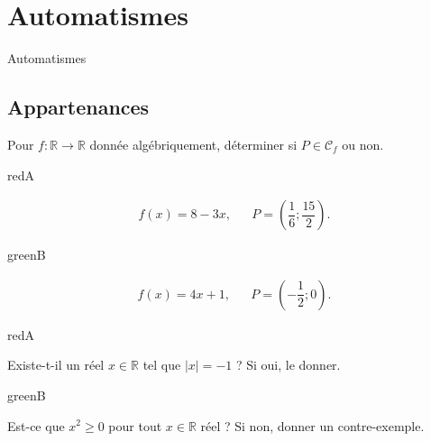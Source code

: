 \documentclass[14pt]{beamer}
\newcommand{\C}{\mathcal{C}}
\newcommand{\R}{\mathbb{R}}
\begin{document}
\section{Automatismes}

\begin{frame}

\centering \huge
Automatismes

\end{frame}

\subsection{Appartenances}


\begin{frame}{1}
	Pour $f:\R\rightarrow\R$ donnée algébriquement, déterminer si $P \in \C_f$ ou non.
	
		\begin{mybox}{red}{A}
		\begin{center}
			\begin{align*} f(x) = 8-3x, && P=\left(\dfrac16; \dfrac{15}2 \right). \end{align*}
		\end{center}
		\end{mybox}
		\begin{mybox}{green}{B}
		\begin{center}
			\begin{align*} f(x) = 4x+1, && P=\left(-\dfrac12; 0\right). \end{align*}
		\end{center}
		\end{mybox}

\end{frame}


\begin{frame}{2}
	
		\begin{mybox}{red}{A}
		\begin{center}
			Existe-t-il un réel $x\in\R$ tel que $|x| = -1$ ? Si oui, le donner.
		\end{center}
		\end{mybox}
		\begin{mybox}{green}{B}
		\begin{center}
			Est-ce que $x^2 \geq 0$ pour tout $x\in\R$ réel ? Si non, donner un contre-exemple.
		\end{center}
		\end{mybox}

\end{frame}
\end{document}
